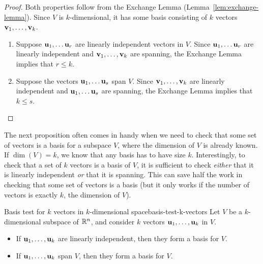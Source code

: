 \begin{proof}
  Both properties follow from the Exchange Lemma
  (Lemma~\ref{lem:exchange-lemma}). Since $V$ is $k$-dimensional, it
  has some basis consisting of $k$ vectors
  $\mbox{\bf v}_1,\ldots,\mbox{\bf v}_k$.
  \begin{enumialphparenastyle}
    \begin{enumerate}
    \item Suppose $\mbox{\bf u}_1,\ldots\mbox{\bf u}_r$ are linearly
      independent vectors in $V$. Since $\mbox{\bf u}_1,\ldots\mbox{\bf u}_r$
      are linearly independent and $\mbox{\bf v}_1,\ldots,\mbox{\bf v}_k$ are
      spanning, the Exchange Lemma implies that $r\leq k$.
    \item Suppose the vectors $\mbox{\bf u}_1,\ldots\mbox{\bf u}_s$ span
      $V$. Since $\mbox{\bf v}_1,\ldots,\mbox{\bf v}_k$ are linearly
      independent and $\mbox{\bf u}_1,\ldots\mbox{\bf u}_s$ are spanning, the
      Exchange Lemma implies that $k\leq s$.
    \end{enumerate}
  \end{enumialphparenastyle}
\end{proof}

The next proposition often comes in handy when we need to check that
some set of vectors is a basis for a subspace $V$, where the dimension
of $V$ is already known. If $\dim(V)=k$, we know that any basis has to
have size $k$. Interestingly, to check that a set of $k$ vectors is a
basis of $V$, it is sufficient to check {\em either} that it is
linearly independent {\em or} that it is spanning. This can save half
the work in checking that some set of vectors is a basis (but it only
works if the number of vectors is exactly $k$, the dimension of $V$).

\begin{proposition}{Basis test for $k$ vectors in $k$-dimensional space}{basis-test-k-vectors}
  Let $V$ be a $k$-dimensional subspace of $\mathbb{R}^n$, and consider $k$
  vectors $\mbox{\bf u}_{1},\ldots,\mbox{\bf u}_{k}$ in $V$.
  \begin{itemize}
  \item If $\mbox{\bf u}_{1},\ldots,\mbox{\bf u}_{k}$ are linearly
    independent, then they form a basis for $V$.
  \item If $\mbox{\bf u}_{1},\ldots,\mbox{\bf u}_{k}$ span $V$, then they
    form a basis for $V$.
  \end{itemize}
\end{proposition}

